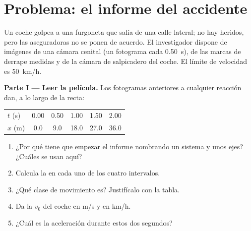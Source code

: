 \section{Problema: el informe del accidente}

\begin{problem}
\label{pb:g12:kinematics-2d:1}
Un coche golpea a una furgoneta que salía de una calle lateral; no hay
heridos, pero las aseguradoras no se ponen de acuerdo. El investigador
dispone de imágenes de una cámara cenital (un fotograma cada
\qty{0.50}{s}), de las marcas de derrape medidas y de la cámara de
salpicadero del coche. El límite de velocidad es \qty{50}{km/h}.

\medskip
\noindent\textbf{Parte I --- Leer la película.}
Los fotogramas anteriores a cualquier reacción dan, a lo largo de la
recta:
\begin{center}\small
\begin{tabular}{lccccc}
$t$ (\unit{s}) & 0.00 & 0.50 & 1.00 & 1.50 & 2.00\\
$x$ (\unit{m}) & 0.0 & 9.0 & 18.0 & 27.0 & 36.0
\end{tabular}
\end{center}
\begin{enumerate}
  \item ¿Por qué tiene que empezar el informe nombrando un sistema y
        unos ejes? ¿Cuáles se usan aquí?
  \item Calcula la  en cada uno de los cuatro
        intervalos.
  \item ¿Qué clase de movimiento es? Justifícalo con la tabla.
  \item Da la  $v_0$ del coche en \unit{m/s} y en \unit{km/h}.
  \item ¿Cuál es la aceleración durante estos dos segundos?
\end{enumerate}


\end{problem}
